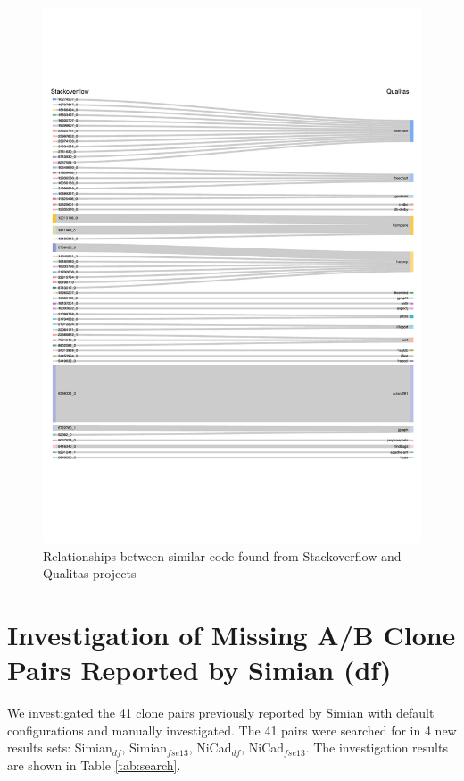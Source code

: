 \documentclass{IEEEtran}
\begin{document}
\begin{figure}[H]
	\centering
	\includegraphics[width=1\linewidth]{Sankey_proj}
	\caption{Relationships between similar code found from Stackoverflow and Qualitas projects}
	\label{fig:sankey}
\end{figure}


\newpage

\section*{Investigation of Missing A/B Clone Pairs Reported by Simian (df)}
We investigated the 41 clone pairs previously reported by Simian with default configurations and manually investigated. The 41 pairs were searched for in 4 new results sets: Simian$_{df}$, Simian$_{fse13}$, NiCad$_{df}$, NiCad$_{fse13}$. The investigation results are shown in Table \ref{tab:search}.
\end{document}
